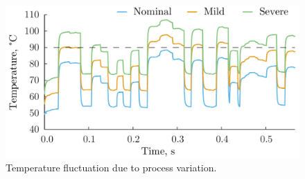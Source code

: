 \begin{figure}[bl]
  \vspace{-1.0em}
  \centering
  \includegraphics[width=1.0\linewidth]{include/assets/motivation-temperature.pdf}
  \vspace{-1.5em}
  \caption{Temperature fluctuation due to process variation.}
\end{figure}
